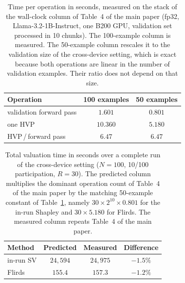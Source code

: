 \documentclass[letterpaper]{article} %
\theoremstyle{plain}
\newcommand{\ourrow}{\rowcolor{ourshade}}     %
\begin{document}
\begin{table}[t]
\centering
\small
\setlength{\tabcolsep}{4pt}
\begin{tabular}{lcc}
\hline
Operation & 100 examples & 50 examples \\
\hline
validation forward pass & $1.601$ & $0.801$ \\
one HVP & $10.360$ & $5.180$ \\
\hline
HVP\,/\,forward pass & $6.47$ & $6.47$ \\
\hline
\end{tabular}
\caption{Time per operation in seconds, measured on the stack of the
wall-clock column of Table~4 of the main paper (fp32,
Llama-3.2-1B-Instruct, one B200 GPU, validation set processed in 10 chunks).
The 100-example column is measured. The 50-example column rescales it to the
validation size of the cross-device setting, which is exact because both
operations are linear in the number of validation examples. Their ratio does
not depend on that size.}
\label{tab:microbench}
\end{table}

\begin{table}[t]
\centering
\small
\setlength{\tabcolsep}{4pt}
\begin{tabular}{lccc}
\hline
Method & Predicted & Measured & Difference \\
\hline
in-run SV & $24{,}594$ & $24{,}975$ & $-1.5\%$ \\
\ourrow Flirds & $155.4$ & $157.3$ & $-1.2\%$ \\
\hline
\end{tabular}
\caption{Total valuation time in seconds over a complete run of the
cross-device setting ($N{=}100$, 10/100 participation, $R{=}30$). The
predicted column multiplies the dominant operation count of Table~4 of the
main paper by the matching 50-example constant of
Table~\ref{tab:microbench}, namely $30 \times 2^{10} \times 0.801$ for the
in-run Shapley and $30 \times 5.180$ for Flirds. The measured column repeats
Table~4 of the main paper.}
\label{tab:cost-check}
\end{table}


\end{document}
